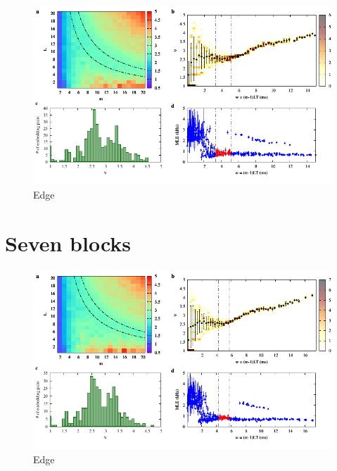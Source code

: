 \begin{figure}[H]
    \centering
    \includegraphics[width=\linewidth]{../6_blocks/2e5_points/plots/chaos_low.pdf}
    \caption{Edge}
    \label{fig:6 blocks chaos}
\end{figure}

\section{Seven blocks}

\begin{figure}[H]
    \centering
    \includegraphics[width=\linewidth]{../7_blocks/edge/2e5_points/plots/chaos_low.pdf}
    \caption{Edge}
    \label{fig:7 blocks chaos}
\end{figure}

